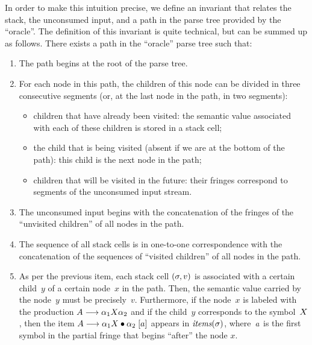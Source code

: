 \documentclass{llncs}
\begin{document}
In order to make this intuition precise, we define an invariant that relates
the stack, the unconsumed input, and a path in the parse tree provided by the
``oracle''. The definition of this invariant is quite technical, but can be
summed up as follows. There exists a path in the ``oracle'' parse tree such
that:
%
\begin{enumerate}
\item The path begins at the root of the parse tree.
\item For each node in this path, the children of this node can be divided
      in three consecutive segments (or, at the last node in the path, in two segments):
      \begin{itemize}
      \item children that have already been visited: the semantic value associated with
            each of these children is stored in a stack cell;
      \item the child that is being visited (absent if we are at the
            bottom of the path): this child is the next node in the path;
      \item children that will be visited in the future: their fringes correspond
            to segments of the unconsumed input stream.
      \end{itemize}
\item The unconsumed input begins with the concatenation of the fringes of
      the ``unvisited children'' of all nodes in the path.
\item The sequence of all stack cells is in one-to-one correspondence with
      the concatenation of the sequences of ``visited children'' of all nodes
      in the path.
\item As per the previous item, each
      stack cell $(\sigma, v)$ is associated with a certain child~$y$ of a
      certain node~$x$ in the path.
      Then, the semantic value carried by the node~$y$ must be precisely~$v$.
      Furthermore, if the node~$x$ is labeled with the production
      $A\longrightarrow\alpha_1X\alpha_2$ and if the child~$y$
      corresponds to the symbol~$X$,
      then the item $A\longrightarrow\alpha_1X{}\bullet{}\alpha_2\;[a]$
      appears in $\textit{items}(\sigma)$,
      where~$a$ is the first symbol in the partial fringe
      that begins ``after'' the node $x$.
\end{enumerate}
\end{document}
